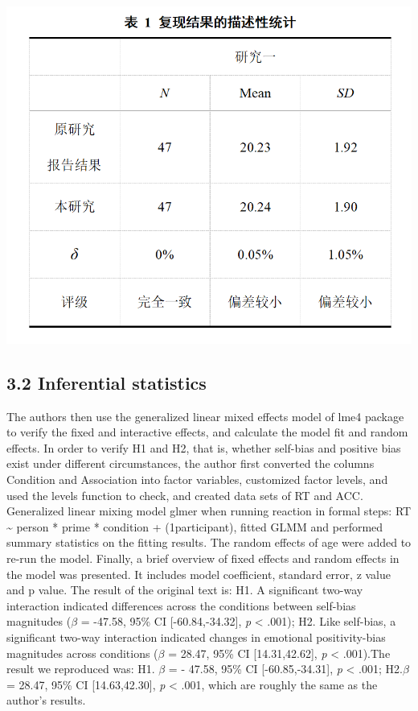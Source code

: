 \documentclass[
  man]{apa6}
\begin{document}
\includegraphics{pic/table1.png}

\subsection{3.2 Inferential statistics}\label{inferential-statistics}

The authors then use the generalized linear mixed effects model of lme4 package to verify the fixed and interactive effects, and calculate the model fit and random effects. In order to verify H1 and H2, that is, whether self-bias and positive bias exist under different circumstances, the author first converted the columns Condition and Association into factor variables, customized factor levels, and used the levels function to check, and created data sets of RT and ACC. Generalized linear mixing model glmer when running reaction in formal steps: RT \textasciitilde{} person * prime * condition + (1\textbar participant), fitted GLMM and performed summary statistics on the fitting results. The random effects of age were added to re-run the model. Finally, a brief overview of fixed effects and random effects in the model was presented. It includes model coefficient, standard error, z value and p value. The result of the original text is: H1. A significant two-way interaction indicated differences across the conditions between self-bias magnitudes (\(\beta\) = -47.58, 95\% CI {[}-60.84,-34.32{]}, \emph{p} \textless{} .001); H2. Like self-bias, a significant two-way interaction indicated changes in emotional positivity-bias magnitudes across conditions (\(\beta\) = 28.47, 95\% CI {[}14.31,42.62{]}, \emph{p} \textless{} .001).The result we reproduced was: H1. \(\beta\) = - 47.58, 95\% CI {[}-60.85,-34.31{]}, \emph{p} \textless{} .001; H2.\(\beta\) = 28.47, 95\% CI {[}14.63,42.30{]}, \emph{p} \textless{} .001, which are roughly the same as the author's results.
\end{document}
